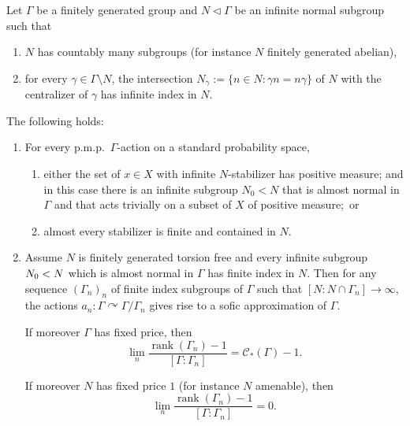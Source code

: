 \documentclass[AHL,Unicode,longabstracts,published]{cedram}
\newcommand{\acting}{\curvearrowright}
\newcommand{\vraicost}{\mathscr{C}}
\DeclareMathOperator{\rank}{rank}
\newcommand{\pmp}{p.m.p.\ }
\newcommand*{\romanenumi}{\renewcommand*{\theenumi}{\roman{enumi}}}
\newcommand*{\alphenumi}{\renewcommand*{\theenumi}{\alph{enumi}}}
\begin{document}
\begin{theo}\label{th: normal subgr f subg --> rel Stuck-Zimmer}
Let $\Gamma$ be a finitely generated group and $N\triangleleft \Gamma$ be an infinite normal subgroup such that
\begin{enumerate}\alphenumi
\item \label{it : assumpt count many sbgr}
$N$ has countably many subgroups (for instance $N$ finitely generated abelian),
\item \label{cond: N and commut of gamma}
for every $\gamma\in \Gamma\setminus N$, the intersection $N_{\gamma}:=\{n\in N: \gamma n=n \gamma \}$ of $N$ with the centralizer of $\gamma$ has infinite index in $N$.
\end{enumerate}

The following holds:
\begin{enumerate}
\item\label{it: rel Stuck-Zimmer}
For every \pmp $\Gamma$-action on a standard probability space,
\begin{enumerate}\romanenumi
\item\label{it: inf normal subgr trivial act}
either the set of $x \in X$ with infinite $N$-stabilizer has positive measure; and in this case there is an infinite subgroup $N_0 < N$ that is almost normal in $\Gamma$ and that acts trivially on a subset of $X$ of positive measure;~or
\item\label{it: or act is free}
almost every stabilizer is finite and contained in $N$.
\end{enumerate}

\item\label{it: index on N to inft -> sofic}
Assume $N$ is finitely generated torsion free and every infinite subgroup $N_0\linebreak<N$ which is almost normal in $\Gamma$ has finite index in $N$. Then for any sequence $(\Gamma_n)_n$ of finite index subgroups of $\Gamma$ such that $[N:N\cap \Gamma_n]\to \infty$, the actions $a_n:\Gamma\acting \Gamma/\Gamma_n$ gives rise to a sofic approximation of $\Gamma$.

If moreover $\Gamma$ has fixed price, then
\begin{equation}
\lim_{n} \frac{
\rank (\Gamma_n)-1}{[\Gamma:\Gamma_n]}=\vraicost_*(\Gamma)-1.
\end{equation}

If moreover $N$ has fixed price $1$ (for instance $N$ amenable), then
\begin{equation}
\lim_{n} \frac{
\rank (\Gamma_n)-1}{ [\Gamma:\Gamma_n]}=0.
\end{equation}
\end{enumerate}
\end{theo}
\end{document}
